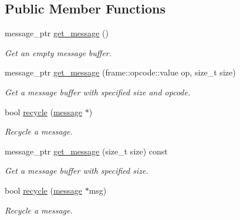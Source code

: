 \subsection*{Public Member Functions}
\begin{DoxyCompactItemize}
\item 
message\+\_\+ptr \mbox{\hyperlink{classwebsocketpp_1_1message__buffer_1_1alloc_1_1con__msg__manager_ab37990d12c3d54f6963df6b0ddadcf28}{get\+\_\+message}} ()
\begin{DoxyCompactList}\small\item\em Get an empty message buffer. \end{DoxyCompactList}\item 
message\+\_\+ptr \mbox{\hyperlink{classwebsocketpp_1_1message__buffer_1_1alloc_1_1con__msg__manager_ab2163fa7f202ebcbad8e77a6b63d8f17}{get\+\_\+message}} (frame\+::opcode\+::value op, size\+\_\+t size)
\begin{DoxyCompactList}\small\item\em Get a message buffer with specified size and opcode. \end{DoxyCompactList}\item 
bool \mbox{\hyperlink{classwebsocketpp_1_1message__buffer_1_1alloc_1_1con__msg__manager_a6373a7891e108a232a2a62a5696295e8}{recycle}} (\mbox{\hyperlink{classwebsocketpp_1_1message__buffer_1_1message}{message}} $\ast$)
\begin{DoxyCompactList}\small\item\em Recycle a message. \end{DoxyCompactList}\item 
message\+\_\+ptr \mbox{\hyperlink{classwebsocketpp_1_1message__buffer_1_1alloc_1_1con__msg__manager_a1d7e3db20ccfebb6f5e73fb12fce007c}{get\+\_\+message}} (size\+\_\+t size) const
\begin{DoxyCompactList}\small\item\em Get a message buffer with specified size. \end{DoxyCompactList}\item 
bool \mbox{\hyperlink{classwebsocketpp_1_1message__buffer_1_1alloc_1_1con__msg__manager_a4e1013bc89944fbfd222b9ab6ad76712}{recycle}} (\mbox{\hyperlink{classwebsocketpp_1_1message__buffer_1_1message}{message}} $\ast$msg)
\begin{DoxyCompactList}\small\item\em Recycle a message. \end{DoxyCompactList}\end{DoxyCompactItemize}


